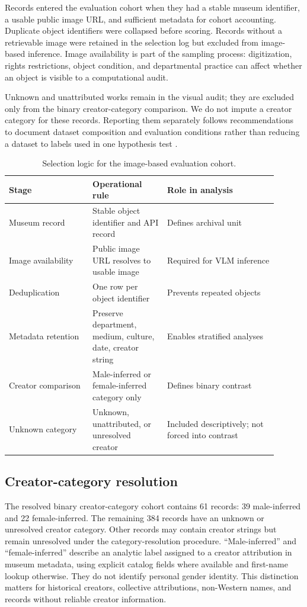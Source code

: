 \documentclass[pdflatex,sn-basic,Numbered]{sn-jnl}
\begin{document}
Records entered the evaluation cohort when they had a stable museum identifier, a usable public image URL, and sufficient metadata for cohort accounting. Duplicate object identifiers were collapsed before scoring. Records without a retrievable image were retained in the selection log but excluded from image-based inference. Image availability is part of the sampling process: digitization, rights restrictions, object condition, and departmental practice can affect whether an object is visible to a computational audit.

Unknown and unattributed works remain in the visual audit; they are excluded only from the binary creator-category comparison. We do not impute a creator category for these records. Reporting them separately follows recommendations to document dataset composition and evaluation conditions rather than reducing a dataset to labels used in one hypothesis test \cite{mitchell2019model}.

\begin{table}[htbp]
\centering
\caption{Selection logic for the image-based evaluation cohort.}
\label{tab:selection}
\begin{tabular}{p{0.28\linewidth}p{0.25\linewidth}p{0.37\linewidth}}
\toprule
Stage & Operational rule & Role in analysis \\
\midrule
Museum record & Stable object identifier and API record & Defines archival unit \\
Image availability & Public image URL resolves to usable image & Required for VLM inference \\
Deduplication & One row per object identifier & Prevents repeated objects \\
Metadata retention & Preserve department, medium, culture, date, creator string & Enables stratified analyses \\
Creator comparison & Male-inferred or female-inferred category only & Defines binary contrast \\
Unknown category & Unknown, unattributed, or unresolved creator & Included descriptively; not forced into contrast \\
\bottomrule
\end{tabular}
\end{table}

\subsection{Creator-category resolution}

The resolved binary creator-category cohort contains 61 records: 39 male-inferred and 22 female-inferred. The remaining 384 records have an unknown or unresolved creator category. Other records may contain creator strings but remain unresolved under the category-resolution procedure. ``Male-inferred'' and ``female-inferred'' describe an analytic label assigned to a creator attribution in museum metadata, using explicit catalog fields where available and first-name lookup otherwise. They do not identify personal gender identity. This distinction matters for historical creators, collective attributions, non-Western names, and records without reliable creator information.
\end{document}
